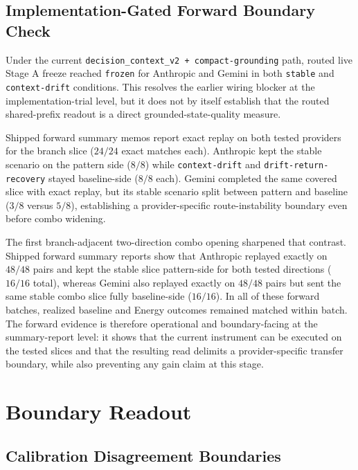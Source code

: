 \documentclass[11pt,a4paper]{article}
\begin{document}
\subsection{Implementation-Gated Forward Boundary Check}
\label{sec:forwardboundary}

Under the current \texttt{decision\_context\_v2 + compact-grounding} path, routed live Stage A freeze reached \texttt{frozen} for Anthropic and Gemini in both \texttt{stable} and \texttt{context-drift} conditions. This resolves the earlier wiring blocker at the implementation-trial level, but it does not by itself establish that the routed shared-prefix readout is a direct grounded-state-quality measure.

Shipped forward summary memos report exact replay on both tested providers for the branch slice (\(24/24\) exact matches each). Anthropic kept the stable scenario on the pattern side (\(8/8\)) while \texttt{context-drift} and \texttt{drift-return-recovery} stayed baseline-side (\(8/8\) each). Gemini completed the same covered slice with exact replay, but its stable scenario split between pattern and baseline (\(3/8\) versus \(5/8\)), establishing a provider-specific route-instability boundary even before combo widening.

The first branch-adjacent two-direction combo opening sharpened that contrast.
Shipped forward summary reports show that Anthropic replayed exactly on
\(48/48\) pairs and kept the stable slice pattern-side for both tested
directions (\(16/16\) total), whereas Gemini also replayed exactly on
\(48/48\) pairs but sent the same stable combo slice fully baseline-side
(\(16/16\)). In all of these forward batches, realized baseline and Energy
outcomes remained matched within batch. The forward evidence is therefore
operational and boundary-facing at the summary-report level: it shows that the
current instrument can be executed on the tested slices and that the resulting
read delimits a provider-specific transfer boundary, while also preventing any
gain claim at this stage.
\section{Boundary Readout}
\label{sec:boundaries}

\subsection{Calibration Disagreement Boundaries}
\label{sec:calibrationboundaries}
\end{document}
